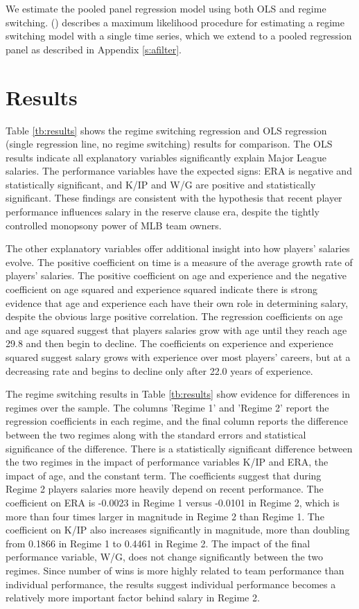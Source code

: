 \documentclass[12pt]{article}
\newcommand{\citee}[1]{\citename{#1} (\citeyear{#1})}
\begin{document}
We estimate the pooled panel regression model using both OLS and regime switching.  \citee{hamilton1989} describes a maximum likelihood procedure for estimating a regime switching model with a single time series, which we extend to a pooled regression panel as described in Appendix \ref{s:afilter}.

\section{Results}

Table \ref{tb:results} shows the regime switching regression and OLS regression (single regression line, no regime switching) results for comparison.  The OLS results indicate all explanatory variables significantly explain Major League salaries.  The performance variables have the expected signs: ERA is negative and statistically significant, and K/IP and W/G are positive and statistically significant.  These findings are consistent with the hypothesis that recent player performance influences salary in the reserve clause era, despite the tightly controlled monopsony power of MLB team owners.  

The other explanatory variables offer additional insight into how players' salaries evolve.  The positive coefficient on time is a measure of the average growth rate of players' salaries.  The positive coefficient on age and experience and the negative coefficient on age squared and experience squared indicate there is strong evidence that age and experience each have their own role in determining salary, despite the obvious large positive correlation.  The regression coefficients on age and age squared suggest that players salaries grow with age until they reach age 29.8 and then begin to decline.  The coefficients on experience and experience squared suggest salary grows with experience over most players' careers, but at a decreasing rate and begins to decline only after 22.0 years of experience.

The regime switching results in Table \ref{tb:results} show evidence for differences in regimes over the sample.  The columns 'Regime 1' and 'Regime 2' report the regression coefficients in each regime, and the final column reports the difference between the two regimes along with the standard errors and statistical significance of the difference.  There is a statistically significant difference between the two regimes in the impact of performance variables K/IP and ERA, the impact of age, and the constant term.  The coefficients suggest that during Regime 2 players salaries more heavily depend on recent performance.  The coefficient on ERA is -0.0023 in Regime 1 versus -0.0101 in Regime 2, which is more than four times larger in magnitude in Regime 2 than Regime 1.  The coefficient on K/IP also increases significantly in magnitude, more than doubling from 0.1866 in Regime 1 to 0.4461 in Regime 2.  The impact of the final performance variable, W/G, does not change significantly between the two regimes.  Since number of wins is more highly related to team performance than individual performance, the results suggest individual performance becomes a relatively more important factor behind salary in Regime 2.
\end{document}
